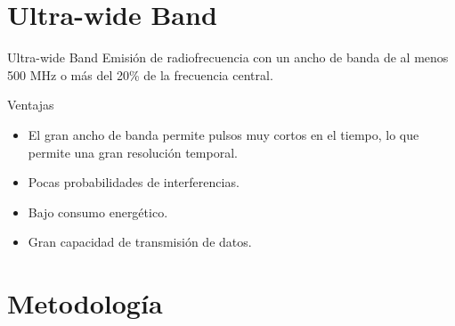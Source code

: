 \documentclass{beamer}
\begin{document}
  \section{Ultra-wide Band}

  \begin{frame}{Ultra-wide Band}
    Emisión de radiofrecuencia con un ancho de banda de al menos 500 MHz o más del 20\% de la frecuencia central.
    
    \vspace{0.3cm}
    Ventajas
    \begin{itemize}
      \item El gran ancho de banda permite pulsos muy cortos en el tiempo, lo que permite una gran resolución temporal.
      \item Pocas probabilidades de interferencias.
      \item Bajo consumo energético.
      \item Gran capacidad de transmisión de datos.
    \end{itemize}
  \end{frame}

\section{Metodología}
\end{document}
